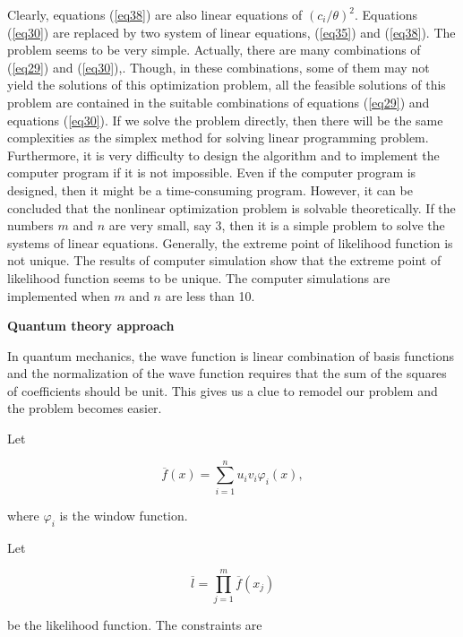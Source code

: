 \documentclass [18pt]{article}
\begin{document}
Clearly, equations (\ref{eq38}) are also linear equations of $(c_i / \theta )^2$.
Equations (\ref{eq30}) are replaced by two system of linear equations, (\ref{eq35}) and
(\ref{eq38}). The problem seems to be very simple. Actually, there are many
combinations of (\ref{eq29}) and (\ref{eq30}),. Though, in these combinations, some of them
may not yield the solutions of this optimization problem, all the feasible
solutions of this problem are contained in the suitable combinations of
equations (\ref{eq29}) and equations (\ref{eq30}). If we solve the problem directly, then
there will be the same complexities as the simplex method for solving linear
programming problem. Furthermore, it is very difficulty to design the
algorithm and to implement the computer program if it is not impossible.
Even if the computer program is designed, then it might be a time-consuming
program. However, it can be concluded that the nonlinear optimization
problem is solvable theoretically. If the numbers $m$ and $n$ are very
small, say 3, then it is a simple problem to solve the systems of linear
equations. Generally, the extreme point of likelihood function is not
unique. The results of computer simulation show that the extreme point of
likelihood function seems to be unique. The computer simulations are
implemented when $m$ and $n$ are less than 10.

\textbf{Quantum theory approach}



In quantum mechanics, the wave function is linear combination of basis
functions and the normalization of the wave function requires that the sum
of the squares of coefficients should be unit. This gives us a clue to
remodel our problem and the problem becomes easier.

Let


\begin{equation}
\label{eq39}
\overline f (x) = \sum\limits_{i = 1}^n {u_i v_i } \varphi _i (x),
\end{equation}



\noindent
where $\varphi _i $ is the window function.

Let


\begin{equation}
\label{eq40}
\overline l = \prod\limits_{j = 1}^m {\overline f (x_j )}
\end{equation}



\noindent
be the likelihood function. The constraints are
\end{document}
